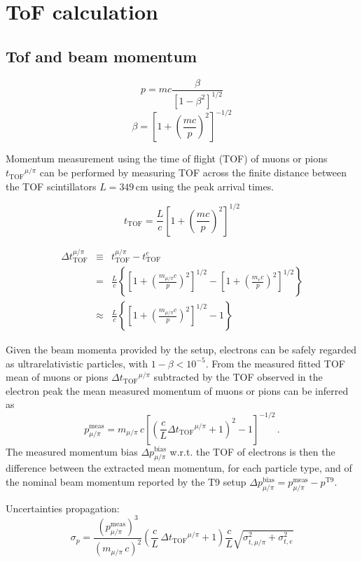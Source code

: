 \documentclass{article}
\newcommand{\ttof}{\ensuremath{t_\mathrm{TOF}}}
\begin{document}
\section{ToF calculation}

\subsection{Tof and beam momentum}


$$ p = mc \frac{\beta}{\left[  1 - \beta^2 \right]^{1/2}}$$
$$ \beta = \left[  1 + \left( \frac{mc}{p} \right)^2 \right]^{-1/2}$$


Momentum measurement using the time of flight (TOF) of muons or pions $\ttof^{\mu/\pi}$ can be performed by measuring TOF across the finite distance between the TOF scintillators $L=349\,\mathrm{cm}$ using the peak arrival times.

$$ t_\mathrm{TOF} = \frac{L}{c} \left[ 1 + \left( \frac{mc}{p}  \right)^2   \right]^{1/2}$$

\begin{eqnarray}
  \Delta t_\mathrm{TOF}^{\mu/\pi} &\equiv&  t^{\mu/\pi}_\mathrm{TOF} - t^e_\mathrm{TOF} \\
    &=& \frac{L}{c}  \left\{  \left[ 1 + \left( \frac{m_{\mu/\pi} c}{p}  \right)^2   \right]^{1/2} -  \left[ 1 + \left( \frac{m_e c}{p}  \right)^2   \right]^{1/2}   \right\} \\
     &\approx& \frac{L}{c}  \left\{  \left[ 1 + \left( \frac{m_{\mu/\pi} c}{p}  \right)^2   \right]^{1/2} - 1  \right\} 
\end{eqnarray}

    Given the beam momenta provided by the setup, electrons can be safely regarded as ultrarelativistic particles, with $1-\beta < 10^{-5}$.
From the measured fitted TOF mean of muons or pions $\Delta\ttof^{\mu/\pi}$ subtracted by the TOF observed in the electron peak the mean measured momentum of muons or pions 
can be inferred as 
$$p_{\mu/\pi}^\mathrm{meas} = m_{\mu/\pi} \, c \left[ \left( \frac{c}{L} \Delta\ttof^{\mu/\pi} + 1 \right)^2  - 1\right]^{-1/2}\,.$$
The measured momentum bias $\Delta p^\mathrm{bias}_{\mu/\pi}$ w.r.t. the TOF of electrons is then the difference between the extracted mean momentum, for each particle type, and of the nominal beam momentum reported by the T9 setup
$\Delta p^\mathrm{bias}_{\mu/\pi} =  p_{\mu/\pi}^\mathrm{meas} -  p^\mathrm{T9}$. 

Uncertainties propagation:
$$ \sigma_p = \frac{ \left( p_{\mu/\pi}^\mathrm{meas} \right)^3}{ \left(  m_{\mu/\pi} \, c \right)^2} \left( \frac{c}{L} \,\Delta\ttof^{\mu/\pi} + 1  \right)  \frac{c}{L} \sqrt{\sigma^2_{t,\mu/\pi} + \sigma^2_{t,e}}$$
\end{document}
